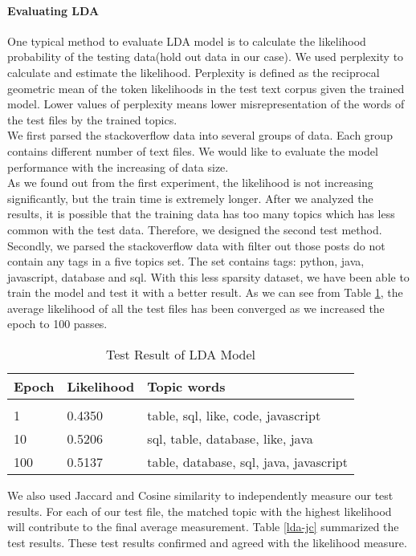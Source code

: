 \paragraph{Evaluating LDA}
One typical method to evaluate LDA model is to calculate the likelihood probability of the testing data(hold out data in our case). We used perplexity to calculate and estimate the likelihood. Perplexity is defined as the reciprocal geometric mean of the token likelihoods in the test text corpus given the trained model. Lower values of perplexity means lower misrepresentation of the words of the test files by the trained topics.\\ 
We first parsed the stackoverflow data into several groups of data. Each group contains different number of text files. We would like to evaluate the model performance with the increasing of  data size.\\
As we found out from the first experiment, the likelihood is not increasing significantly, but the train time is extremely longer. After we analyzed the results, it is possible that the training data has too many topics which has less common with the test data. Therefore, we designed the second test method.\\
Secondly, we parsed the stackoverflow data with filter out those posts do not contain any tags in a five topics set. The set contains tags: python, java, javascript, database and sql. With this less sparsity dataset, we have been able to train the model and test it with a better result. As we can see from Table \ref{lda-result}, the average likelihood of all the test files has been converged as we increased the epoch to 100 passes.\\
\begin{table}[!htbp]
\caption{Test Result of LDA Model}
\label{lda-result}
\begin{center}
\begin{tabular}{  l  l l}
\bf Epoch & \bf Likelihood & \bf Topic words\\ \hline \\
1         &0.4350 & table, sql, like, code, javascript\\
10       &0.5206 & sql, table, database, like, java\\
100     &0.5137& table, database, sql, java, javascript\\
\end{tabular}
\end{center}
\end{table}
We also used Jaccard and Cosine similarity to independently measure our test results. For each of our test file, the matched topic with the highest likelihood will contribute to the final average measurement. Table \ref{lda-jc} summarized the test results. These test results confirmed and agreed with the likelihood measure. \\
